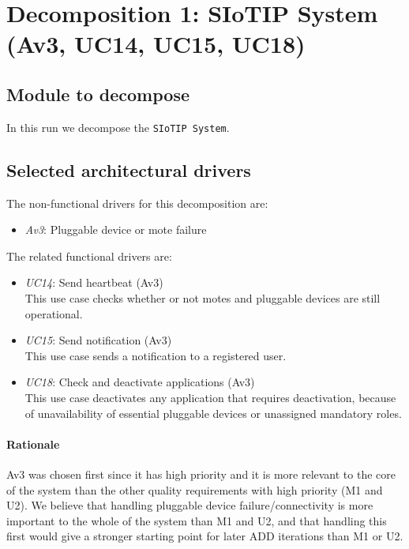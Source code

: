 \section{Decomposition 1: SIoTIP System (Av3, UC14, UC15, UC18)}

\subsection{Module to decompose}
    In this run we decompose the \texttt{SIoTIP System}.


\subsection{Selected architectural drivers}
    The non-functional drivers for this decomposition are:
    \begin{itemize}
    	\item \emph{Av3}: Pluggable device or mote failure
    \end{itemize}

    The related functional drivers are:
    \begin{itemize}
    	\item \emph{UC14}: Send heartbeat (Av3) \\
              This use case checks whether or not motes and pluggable devices
              are still operational.
    	\item \emph{UC15}: Send notification (Av3) \\
              This use case sends a notification to a registered user.
    	\item \emph{UC18}: Check and deactivate applications (Av3) \\
              This use case deactivates any application that requires deactivation,
              because of unavailability of essential pluggable devices
              or unassigned mandatory roles.
    \end{itemize}

    \paragraph{Rationale}
        Av3 was chosen first since it has high priority and it is more relevant to
        the core of the system than the other quality requirements with high
        priority (M1 and U2).
        We believe that handling pluggable device failure/connectivity is
        more important to the whole of the system than M1 and U2, and that
        handling this first would give a stronger starting point for later ADD iterations
        than M1 or U2.


